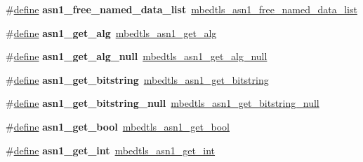 \begin{DoxyCompactItemize}
\item 
\mbox{\label{compat-1_83_8h_a3c590b7c9c8a3d7d457bdaf7720377de}} 
\#\hyperlink{structdefine}{define} {\bfseries asn1\+\_\+free\+\_\+named\+\_\+data\+\_\+list}~\hyperlink{asn1_8h_afd1a084a9285cebcd289bf6df0e6c021}{mbedtls\+\_\+asn1\+\_\+free\+\_\+named\+\_\+data\+\_\+list}
\item 
\mbox{\label{compat-1_83_8h_a2f7bca82b24f7cd072cff05b86d8c114}} 
\#\hyperlink{structdefine}{define} {\bfseries asn1\+\_\+get\+\_\+alg}~\hyperlink{asn1_8h_add253579640ea717f368d9a0f6085be0}{mbedtls\+\_\+asn1\+\_\+get\+\_\+alg}
\item 
\mbox{\label{compat-1_83_8h_ab9df41f423cb1470d966dfc4c1894e72}} 
\#\hyperlink{structdefine}{define} {\bfseries asn1\+\_\+get\+\_\+alg\+\_\+null}~\hyperlink{asn1_8h_adad023ecf92a50d47eaf206705efdb0e}{mbedtls\+\_\+asn1\+\_\+get\+\_\+alg\+\_\+null}
\item 
\mbox{\label{compat-1_83_8h_a8feb228af8da65a9e159cb74eb8be01e}} 
\#\hyperlink{structdefine}{define} {\bfseries asn1\+\_\+get\+\_\+bitstring}~\hyperlink{asn1_8h_ae2dcf021cf1326b62e2f23aa3bda69d0}{mbedtls\+\_\+asn1\+\_\+get\+\_\+bitstring}
\item 
\mbox{\label{compat-1_83_8h_ab86dc74aa8e95f68bd12767e0f7df9d7}} 
\#\hyperlink{structdefine}{define} {\bfseries asn1\+\_\+get\+\_\+bitstring\+\_\+null}~\hyperlink{asn1_8h_a0f9d2d846b16d5ce18ad99de6224313b}{mbedtls\+\_\+asn1\+\_\+get\+\_\+bitstring\+\_\+null}
\item 
\mbox{\label{compat-1_83_8h_ae3b22fb36325de907d7af17e84372e04}} 
\#\hyperlink{structdefine}{define} {\bfseries asn1\+\_\+get\+\_\+bool}~\hyperlink{asn1_8h_aec9e4bbd8690a8ab17cabf87893dbd2b}{mbedtls\+\_\+asn1\+\_\+get\+\_\+bool}
\item 
\mbox{\label{compat-1_83_8h_ad3e839bb5f09993d6a1584ead6b2ecdd}} 
\#\hyperlink{structdefine}{define} {\bfseries asn1\+\_\+get\+\_\+int}~\hyperlink{asn1_8h_a7f8a8b447c11f2200cc5aa8033801b72}{mbedtls\+\_\+asn1\+\_\+get\+\_\+int}
\item 
\mbox{\label{compat-1_83_8h_a909f560c8c902a44560059afcb5e28f2}} 

\end{DoxyCompactItemize}
